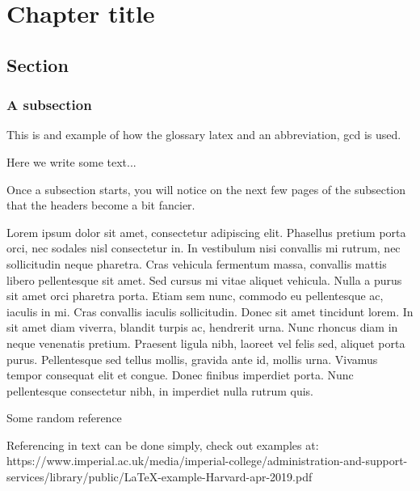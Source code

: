 \newpage

\chapter{Chapter title}
\section{Section}
\subsection{A subsection}

This is and example of how the glossary \Gls{latex} and an abbreviation, \gls{gcd} is used.

Here we write some text...

Once a subsection starts, you will notice on the next few pages of the subsection that the headers become a bit fancier.

Lorem ipsum dolor sit amet, consectetur adipiscing elit. Phasellus pretium porta orci, nec sodales nisl consectetur in. In vestibulum nisi convallis mi rutrum, nec sollicitudin neque pharetra. Cras vehicula fermentum massa, convallis mattis libero pellentesque sit amet. Sed cursus mi vitae aliquet vehicula. Nulla a purus sit amet orci pharetra porta. Etiam sem nunc, commodo eu pellentesque ac, iaculis in mi. Cras convallis iaculis sollicitudin. Donec sit amet tincidunt lorem. In sit amet diam viverra, blandit turpis ac, hendrerit urna. Nunc rhoncus diam in neque venenatis pretium. Praesent ligula nibh, laoreet vel felis sed, aliquet porta purus. Pellentesque sed tellus mollis, gravida ante id, mollis urna. Vivamus tempor consequat elit et congue. Donec finibus imperdiet porta. Nunc pellentesque consectetur nibh, in imperdiet nulla rutrum quis.

Some random reference \cite{albertyUseLegendreTransforms2001}

Referencing in text can be done simply, check out examples at:
https://www.imperial.ac.uk/media/imperial-college/administration-and-support-services/library/public/LaTeX-example-Harvard-apr-2019.pdf

